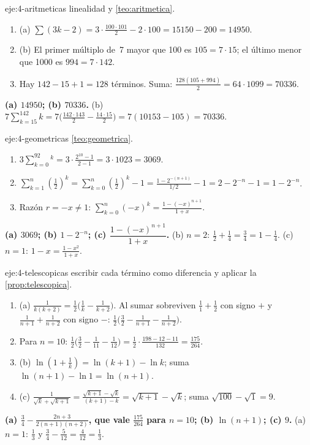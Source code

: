 \begin{solucion}{eje:4-aritmeticas}
\planteamiento linealidad y \cref{teo:aritmetica}.
\pasos
\begin{enumerate}[label=\arabic*.]
  \item (a) $\sum(3k-2)=3\cdot\frac{100\cdot101}2-2\cdot100=15150-200=14950$.
  \item (b) El primer múltiplo de~7 mayor que 100 es $105=7\cdot15$; el último menor que 1000 es $994=7\cdot142$.
  \item Hay $142-15+1=128$ términos. Suma: $\frac{128(105+994)}2=64\cdot1099=70336$.
\end{enumerate}
\resultado \textbf{(a) $14950$; (b) $70336$.}
\comprobacion (b) $7\sum_{k=15}^{142}k=7\bigl(\frac{142\cdot143}2-\frac{14\cdot15}2\bigr)=7(10153-105)=70336$.
\end{solucion}

\begin{solucion}{eje:4-geometricas}
\planteamiento \cref{teo:geometrica}.
\pasos
\begin{enumerate}[label=(\alph*)]
  \item $3\sum_{k=0}^92^k=3\cdot\frac{2^{10}-1}{2-1}=3\cdot1023=3069$.
  \item $\sum_{k=1}^n(\frac12)^k=\sum_{k=0}^n(\frac12)^k-1=\frac{1-2^{-(n+1)}}{1/2}-1=2-2^{-n}-1=1-2^{-n}$.
  \item Razón $r=-x\neq1$: $\sum_{k=0}^n(-x)^k=\frac{1-(-x)^{n+1}}{1+x}$.
\end{enumerate}
\resultado \textbf{(a) $3069$; (b) $1-2^{-n}$; (c) $\dfrac{1-(-x)^{n+1}}{1+x}$.}
\comprobacion (b) $n=2$: $\frac12+\frac14=\frac34=1-\frac14$. (c) $n=1$: $1-x=\frac{1-x^2}{1+x}$.
\end{solucion}

\begin{solucion}{eje:4-telescopicas}
\planteamiento escribir cada término como diferencia y aplicar la \cref{prop:telescopica}.
\pasos
\begin{enumerate}[label=\arabic*.]
  \item (a) $\frac1{k(k+2)}=\frac12\bigl(\frac1k-\frac1{k+2}\bigr)$. Al sumar sobreviven $\frac11+\frac12$ con signo $+$ y $\frac1{n+1}+\frac1{n+2}$ con signo $-$: $\frac12\bigl(\frac32-\frac1{n+1}-\frac1{n+2}\bigr)$.
  \item Para $n=10$: $\frac12\bigl(\frac32-\frac1{11}-\frac1{12}\bigr)=\frac12\cdot\frac{198-12-11}{132}=\frac{175}{264}$.
  \item (b) $\ln(1+\frac1k)=\ln(k+1)-\ln k$; suma $\ln(n+1)-\ln1=\ln(n+1)$.
  \item (c) $\frac1{\sqrt k+\sqrt{k+1}}=\frac{\sqrt{k+1}-\sqrt k}{(k+1)-k}=\sqrt{k+1}-\sqrt k$; suma $\sqrt{100}-\sqrt1=9$.
\end{enumerate}
\resultado \textbf{(a) $\frac34-\frac{2n+3}{2(n+1)(n+2)}$, que vale $\frac{175}{264}$ para $n=10$; (b) $\ln(n+1)$; (c) $9$.}
\comprobacion (a) $n=1$: $\frac13$ y $\frac34-\frac5{12}=\frac4{12}=\frac13$.
\end{solucion}


